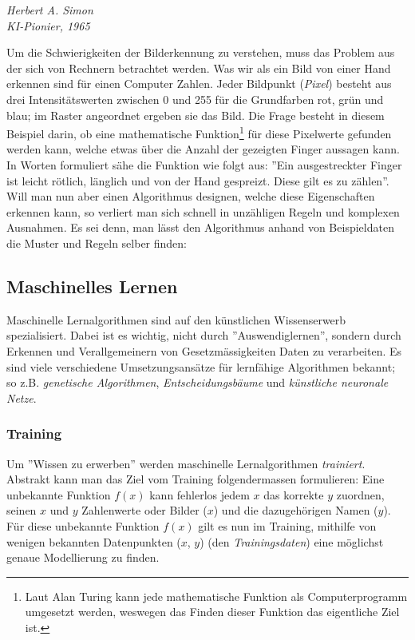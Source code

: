 \epigraph{\cite{hasimon}}{\textit{Herbert A. Simon\\ \textit{KI}-Pionier, 1965}}

Um die Schwierigkeiten der Bilderkennung zu verstehen, muss das Problem aus der sich von Rechnern betrachtet werden. Was wir als ein Bild von einer Hand erkennen sind für einen Computer Zahlen. Jeder Bildpunkt (\textit{Pixel}) besteht aus drei Intensitätswerten zwischen 0 und 255 für die Grundfarben rot, grün und blau; im Raster angeordnet ergeben sie das Bild. Die Frage besteht in diesem Beispiel darin, ob eine mathematische Funktion\footnote{Laut Alan Turing kann jede mathematische Funktion als Computerprogramm umgesetzt werden\cite{alanturing}, weswegen das Finden dieser Funktion das eigentliche Ziel ist.} für diese Pixelwerte gefunden werden kann, welche etwas über die Anzahl der gezeigten Finger aussagen kann. In Worten formuliert sähe die Funktion wie folgt aus: ''Ein ausgestreckter Finger ist leicht rötlich, länglich und von der Hand gespreizt. Diese gilt es zu zählen''. Will man nun aber einen Algorithmus designen, welche diese Eigenschaften erkennen kann, so verliert man sich schnell in unzähligen Regeln und komplexen Ausnahmen. Es sei denn, man lässt den Algorithmus anhand von Beispieldaten die Muster und Regeln selber finden:

\subsection{Maschinelles Lernen}\label{cha:theo:ml}
Maschinelle Lernalgorithmen sind auf den künstlichen Wissenserwerb spezialisiert. Dabei ist es wichtig, nicht durch ''Auswendiglernen'', sondern durch Erkennen und Verallgemeinern von Gesetzmässigkeiten Daten zu verarbeiten. Es sind viele verschiedene Umsetzungsansätze für lernfähige Algorithmen bekannt; so z.B. \textit{genetische Algorithmen}, \textit{Entscheidungsbäume} und \textit{künstliche neuronale Netze}.

\subsubsection{Training}\label{cha:theo:ml:training}
Um ''Wissen zu erwerben'' werden maschinelle Lernalgorithmen \textit{trainiert}. Abstrakt kann man das Ziel vom Training folgendermassen formulieren: Eine unbekannte Funktion $f(x)$ kann fehlerlos jedem $x$ das korrekte $y$ zuordnen, seinen $x$ und $y$ Zahlenwerte oder Bilder ($x$) und die dazugehörigen Namen ($y$). Für diese unbekannte Funktion $f(x)$  gilt es nun im Training, mithilfe von wenigen bekannten Datenpunkten ($x$, $y$) (den \textit{Trainingsdaten}) eine möglichst genaue Modellierung zu finden.


